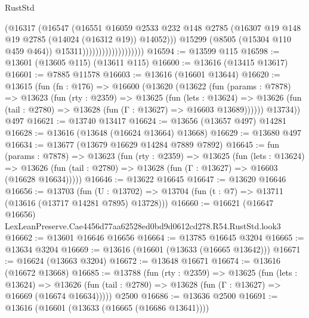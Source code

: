 \begin{lexlean}{RustStd}
\begin{coremodule}
                                        (@16317
                                          (@16547
                                            (@16551
                                              @16059
                                              @2533
                                              @232
                                              @148
                                              @2785
                                              (@16307
                                                @19
                                                @148
                                                @19
                                                @2785
                                                (@14024 (@16312 @19))
                                                @14052)))
                                          @15299
                                          (@8505 (@15304 @110 @459 @464))
                                          @15311)))))))))))))))))))
@16594 := @13599 @115
@16598 := @13601 (@13605 @115) (@13611 @115)
@16600 := @13616 (@13415 @13617)
@16601 := @7885 @11578
@16603 := @13616 (@16601 @13644)
@16620 := @13615
    (fun (fn : @176) =>
    @16600
      (@13620
        (@13622
          (fun (params : @7878) =>
          @13623
            (fun (rty : @2359) =>
            @13625
              (fun (lets : @13624) =>
              @13626 (fun (tail : @2780) => @13628 (fun (Γ : @13627) => @16603 @13689))))))
        @13734))
    @497
@16621 := @13740 @13417
@16624 := @13656 (@13657 @497) @14281
@16628 := @13616 (@13648 (@16624 @13664) @13668)
@16629 := @13680 @497
@16634 := @13677 (@13679 @16629 @14284 @7889 @7892)
@16645 := fun (params : @7878) =>
  @13623
    (fun (rty : @2359) =>
    @13625
      (fun (lets : @13624) =>
      @13626 (fun (tail : @2780) => @13628 (fun (Γ : @13627) => @16603 (@16628 @16634)))))
@16646 := @13622 @16645
@16647 := @13620 @16646
@16656 := @13703
    (fun (U : @13702) => @13704 (fun (t : @7) => @13711 (@13616 (@13717 @14281 @7895) @13728)))
@16660 := @16621 (@16647 @16656) LexLeanPreserve.Cae4456d77aa62528ed0bd9d0612cd278.R54.RustStd.look3
@16662 := @13601 @16646 @16656
@16664 := @13785 @16645 @3204
@16665 := @13634 @3204
@16669 := @13616 (@16601 (@13633 (@16665 @13642)))
@16671 := @16624 (@13663 @3204)
@16672 := @13648 @16671
@16674 := @13616 (@16672 @13668)
@16685 := @13788
    (fun (rty : @2359) =>
    @13625
      (fun (lets : @13624) =>
      @13626 (fun (tail : @2780) => @13628 (fun (Γ : @13627) => @16669 (@16674 @16634)))))
    @2500
@16686 := @13636 @2500
@16691 := @13616 (@16601 (@13633 (@16665 (@16686 @13641))))

\end{coremodule}
\end{lexlean}
